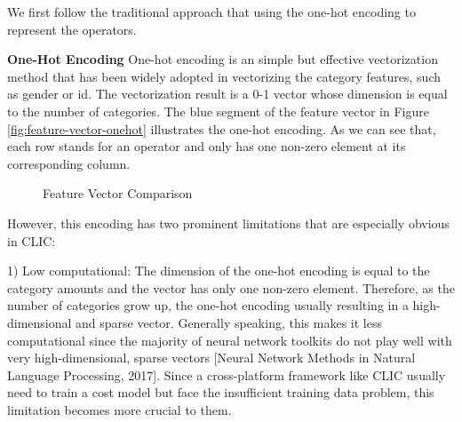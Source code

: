 We first follow the traditional approach that using the one-hot encoding to represent the operators.

\textbf{One-Hot Encoding}
One-hot encoding is an simple but effective vectorization method that has been widely adopted in vectorizing the category features, such as gender or id. 
The vectorization result is a 0-1 vector whose dimension is equal to the number of categories.
The blue segment of the feature vector in Figure \ref{fig:feature-vector-onehot} illustrates the one-hot encoding. 
As we can see that, each row stands for an operator and only has one non-zero element at its corresponding column.

\begin{figure}
  \caption{Feature Vector Comparison}
  \label{fig:feature-vector}
\end{figure}

However, this encoding has two prominent limitations that are especially obvious in CLIC:

1) Low computational: 
The dimension of the one-hot encoding is equal to the category amounts and the vector has only one non-zero element.
Therefore, as the number of categories grow up, the one-hot encoding usually resulting in a high-dimensional and sparse vector. 
Generally speaking, this makes it less computational since the majority of neural network toolkits do not play well with very high-dimensional, sparse vectors [Neural Network Methods in Natural Language Processing, 2017]. 
Since a cross-platform framework like CLIC usually need to train a cost model but face the insufficient training data problem, 
this limitation becomes more crucial to them.

